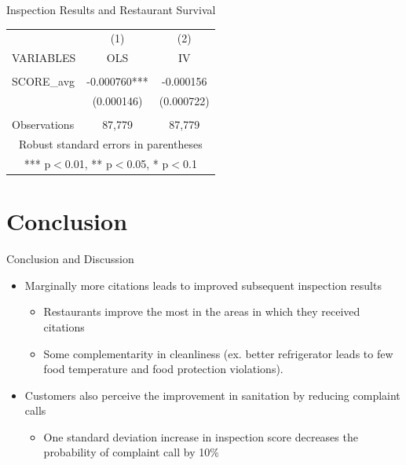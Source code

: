 \documentclass[handout]{beamer}
\begin{document}
\begin{frame}{Inspection Results and Restaurant Survival}
\begin{table}[]
    \centering
    \scalebox{0.7}
    {
\begin{tabular}{lcc} \hline
 & (1) & (2) \\
VARIABLES & OLS & IV \\ \hline
 &  &  \\
SCORE\_avg & -0.000760*** & -0.000156 \\
 & (0.000146) & (0.000722) \\
 &  &  \\
 Observations & 87,779 & 87,779 \\ \hline
\multicolumn{3}{c}{ Robust standard errors in parentheses} \\
\multicolumn{3}{c}{ *** p$<$0.01, ** p$<$0.05, * p$<$0.1} \\
\end{tabular}
}
\end{table}
\end{frame}
\fi

\section{Conclusion}

\begin{frame}{Conclusion and Discussion}
\begin{itemize}
\item Marginally more citations leads to improved subsequent inspection results
\begin{itemize}
\item Restaurants improve the most in the areas in which they received citations  
\item Some complementarity in cleanliness (ex. better refrigerator leads to few food temperature and food protection violations). 
\end{itemize}
\item Customers also perceive the improvement in sanitation by reducing complaint calls
\begin{itemize}
\item One standard deviation increase in inspection score decreases the probability of complaint call by 10\%
\end{itemize}
\end{itemize}
\end{frame}
\end{document}
